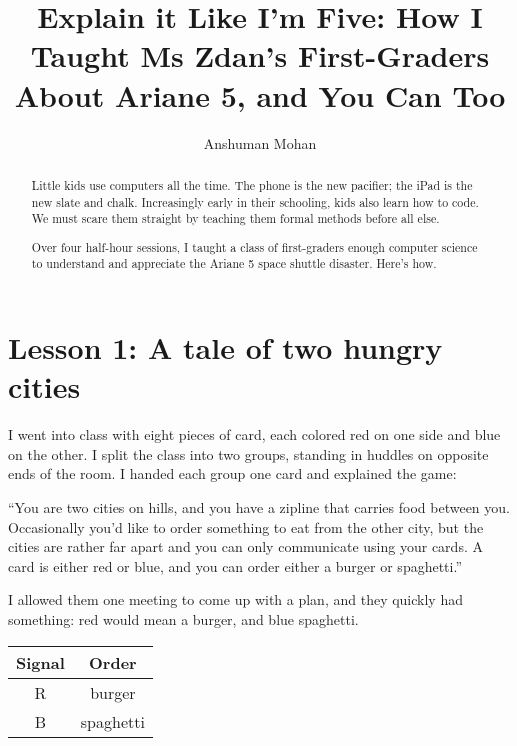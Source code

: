 \documentclass[sigplan]{acmart}
\begin{document}
\title[Explain it Like I'm Five]{Explain it Like I'm Five: How I Taught Ms Zdan's First-Graders About Ariane 5, and You Can Too}

\author{Anshuman Mohan}

\begin{abstract}

Little kids use computers all the time.
The phone is the new pacifier; the iPad is the new slate and chalk.
Increasingly early in their schooling, kids also learn how to code.
We must scare them straight by teaching them formal methods before all else.

Over four half-hour sessions, I taught a class of first-graders enough computer science to understand and appreciate the Ariane 5 space shuttle disaster.
Here's how.

\end{abstract}

\maketitle

\section*{Lesson 1: A tale of two hungry cities}

I went into class with eight pieces of card, each colored red on one side and blue on the other.
I split the class into two groups, standing in huddles on opposite ends of the room.
I handed each group one card and explained the game:

``You are two cities on hills, and you have a zipline that carries food between you.
Occasionally you'd like to order something to eat from the other city, but the cities are rather far apart and you can only communicate using your cards.
A card is either red or blue, and you can order either a burger or spaghetti.''

I allowed them one meeting to come up with a plan, and they quickly had something: red would mean a burger, and blue spaghetti.

\begin{table}[h]\sffamily
  \begin{tabular}{cc}
  Signal & Order \\
  \midrule
  R & burger \\
  B & spaghetti \\
  \end{tabular}
\end{table}
\end{document}

